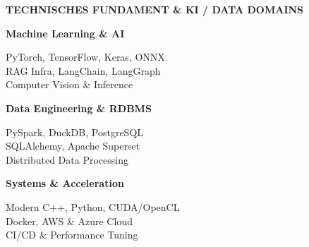 \documentclass[10pt,a4paper]{article}
\begin{document}
\colorbox{primary!10}{%
\parbox{\dimexpr\textwidth-2\fboxsep\relax}{%
    \vspace{0.10cm}
    \centering
    {\bfseries\color{primary} TECHNISCHES FUNDAMENT \& KI / DATA DOMAINS\par}
    \vspace{0.08cm}

    \begin{minipage}[t]{0.31\linewidth}
        \raggedright
        \textbf{\color{primary}Machine Learning \& AI}\par
        PyTorch, TensorFlow, Keras, ONNX\\
        RAG Infra, LangChain, LangGraph\\
        Computer Vision \& Inference
    \end{minipage}
    \hfill
    \begin{minipage}[t]{0.31\linewidth}
        \raggedright
        \textbf{\color{primary}Data Engineering \& RDBMS}\par
        PySpark, DuckDB, PostgreSQL\\
        SQLAlchemy, Apache Superset\\
        Distributed Data Processing
    \end{minipage}
    \hfill
    \begin{minipage}[t]{0.31\linewidth}
        \raggedright
        \textbf{\color{primary}Systems \& Acceleration}\par
        Modern C++, Python, CUDA/OpenCL\\
        Docker, AWS \& Azure Cloud\\
        CI/CD \& Performance Tuning
    \end{minipage}

    \vspace{0.08cm}
}%
}

\vspace{0.15cm}
\end{document}
